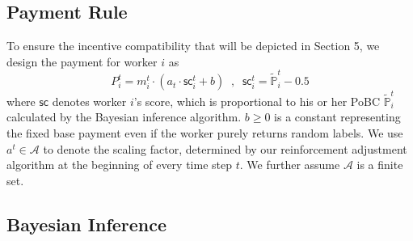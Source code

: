 \subsection{Payment Rule}
\label{payment}
To ensure the incentive compatibility that will be depicted in Section 5, we design the payment for worker $i$ as
\begin{equation}
P^t_i=m^t_i\cdot (a_t \cdot \textsf{sc}^{t}_i+b)\;\; , \;\; \textsf{sc}^{t}_i = \tilde{\mathbb{P}}^{t}_i - 0.5
\label{equation:payment}
\end{equation}
where $\textsf{sc}$ denotes worker $i$'s score, which is proportional to his or her PoBC $\tilde{\mathbb{P}}^{t}_i$ calculated by the Bayesian inference algorithm. $b\geq 0$ is a constant representing the fixed base payment even if the worker purely returns random labels. We use $a^t \in \mathcal{A}$ to denote the scaling factor, determined by our reinforcement adjustment algorithm at the beginning of every time step $t$. We further assume $\mathcal{A}$ is a finite set.


\subsection{Bayesian Inference}
\label{inference}


